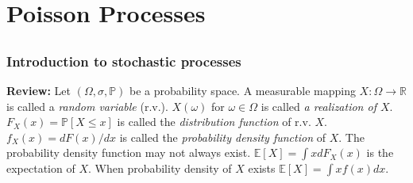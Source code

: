 \documentclass[all-lectures.tex]{subfiles}
\begin{document}

\chapter{Poisson Processes}
\setcounter{section}{1}
\setcounter{subsection}{0}
\section*{}
\subsection{Introduction to stochastic processes}

\indent \textbf{Review:} Let $(\Omega,\sigma,\mathbb{P})$ be a probability space. A measurable mapping $X:\Omega \to \mathbb{R}$ is called a \textit{random variable} (r.v.). $X(\omega)$ for $\omega \in \Omega$ is called \textit{a realization of $X$}. $F_X (x) = \mathbb{P}[X\leq x]$ is called the \textit{distribution function} of r.v. $X$. $f_X(x) = dF(x)/dx$ is called the \textit{probability density function} of $X$. The probability density function may not always exist. $\mathbb{E}[X] = \int x dF_X(x) $ is the expectation of $X$. When probability density of $X$ exists $\mathbb{E}[X] = \int xf(x)dx$.\\
\end{document}
